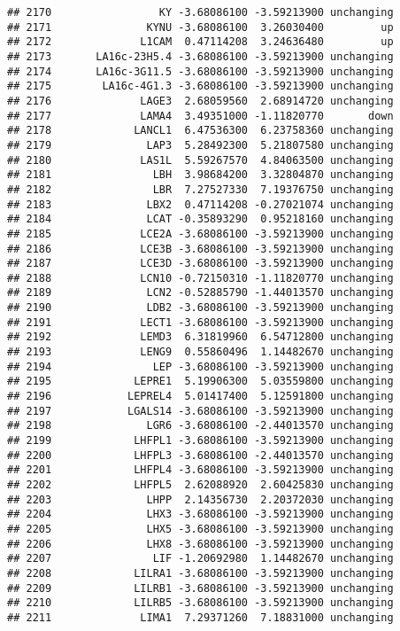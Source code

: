 \documentclass[]{article}
\begin{document}
\begin{verbatim}
## 2170                 KY -3.68086100 -3.59213900 unchanging
## 2171               KYNU -3.68086100  3.26030400         up
## 2172              L1CAM  0.47114208  3.24636480         up
## 2173       LA16c-23H5.4 -3.68086100 -3.59213900 unchanging
## 2174       LA16c-3G11.5 -3.68086100 -3.59213900 unchanging
## 2175        LA16c-4G1.3 -3.68086100 -3.59213900 unchanging
## 2176              LAGE3  2.68059560  2.68914720 unchanging
## 2177              LAMA4  3.49351000 -1.11820770       down
## 2178             LANCL1  6.47536300  6.23758360 unchanging
## 2179               LAP3  5.28492300  5.21807580 unchanging
## 2180              LAS1L  5.59267570  4.84063500 unchanging
## 2181                LBH  3.98684200  3.32804870 unchanging
## 2182                LBR  7.27527330  7.19376750 unchanging
## 2183               LBX2  0.47114208 -0.27021074 unchanging
## 2184               LCAT -0.35893290  0.95218160 unchanging
## 2185              LCE2A -3.68086100 -3.59213900 unchanging
## 2186              LCE3B -3.68086100 -3.59213900 unchanging
## 2187              LCE3D -3.68086100 -3.59213900 unchanging
## 2188              LCN10 -0.72150310 -1.11820770 unchanging
## 2189               LCN2 -0.52885790 -1.44013570 unchanging
## 2190               LDB2 -3.68086100 -3.59213900 unchanging
## 2191              LECT1 -3.68086100 -3.59213900 unchanging
## 2192              LEMD3  6.31819960  6.54712800 unchanging
## 2193              LENG9  0.55860496  1.14482670 unchanging
## 2194                LEP -3.68086100 -3.59213900 unchanging
## 2195             LEPRE1  5.19906300  5.03559800 unchanging
## 2196            LEPREL4  5.01417400  5.12591800 unchanging
## 2197            LGALS14 -3.68086100 -3.59213900 unchanging
## 2198               LGR6 -3.68086100 -2.44013570 unchanging
## 2199             LHFPL1 -3.68086100 -3.59213900 unchanging
## 2200             LHFPL3 -3.68086100 -2.44013570 unchanging
## 2201             LHFPL4 -3.68086100 -3.59213900 unchanging
## 2202             LHFPL5  2.62088920  2.60425830 unchanging
## 2203               LHPP  2.14356730  2.20372030 unchanging
## 2204               LHX3 -3.68086100 -3.59213900 unchanging
## 2205               LHX5 -3.68086100 -3.59213900 unchanging
## 2206               LHX8 -3.68086100 -3.59213900 unchanging
## 2207                LIF -1.20692980  1.14482670 unchanging
## 2208             LILRA1 -3.68086100 -3.59213900 unchanging
## 2209             LILRB1 -3.68086100 -3.59213900 unchanging
## 2210             LILRB5 -3.68086100 -3.59213900 unchanging
## 2211              LIMA1  7.29371260  7.18831000 unchanging

\end{verbatim}
\end{document}
